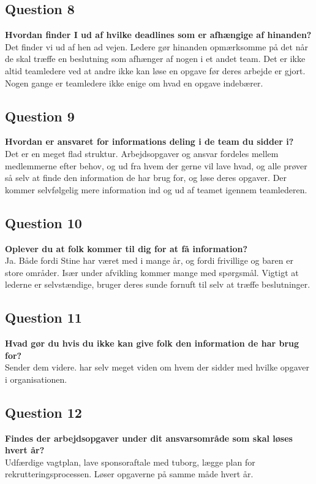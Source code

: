 \subsection{Question 8}
\label{i4q8}
\noindent \textbf{Hvordan finder I ud af hvilke deadlines som er afhængige af hinanden?} \\
Det finder vi ud af hen ad vejen. Ledere gør hinanden opmærksomme på det når de skal træffe en beslutning som afhænger af nogen i et andet team. Det er ikke altid teamledere ved at andre ikke kan løse en opgave før deres arbejde er gjort. Nogen gange er teamledere ikke enige om hvad en opgave indebærer.

\subsection{Question 9}
\label{i4q9}
\noindent \textbf{Hvordan er ansvaret for informations deling i de team du sidder i?} \\
Det er en meget flad struktur. Arbejdsopgaver og ansvar fordeles mellem medlemmerne efter behov, og ud fra hvem der gerne vil lave hvad, og alle prøver så selv at finde den information de har brug for, og løse deres opgaver. Der kommer selvfølgelig mere information ind og ud af teamet igennem  teamlederen.

\subsection{Question 10}
\label{i4q10}
\noindent \textbf{Oplever du at folk kommer til dig for at få information?} \\
Ja. Både fordi Stine har været med i mange år, og fordi frivillige og baren er store områder. Især under afvikling kommer mange med spørgsmål. Vigtigt at lederne er selvstændige, bruger deres sunde fornuft til selv at træffe beslutninger. 

\subsection{Question 11}
\label{i4q11}
\noindent \textbf{Hvad gør du hvis du ikke kan give folk den information de har brug for?} \\
Sender dem videre. har selv meget viden om hvem der sidder med hvilke opgaver i organisationen.

\subsection{Question 12}
\label{i4q12}
\noindent \textbf{Findes der arbejdsopgaver under dit ansvarsområde som skal løses hvert år?} \\
Udfærdige vagtplan, lave sponsoraftale med tuborg, lægge plan for rekrutteringsprocessen. Løser opgaverne på samme måde hvert år.

